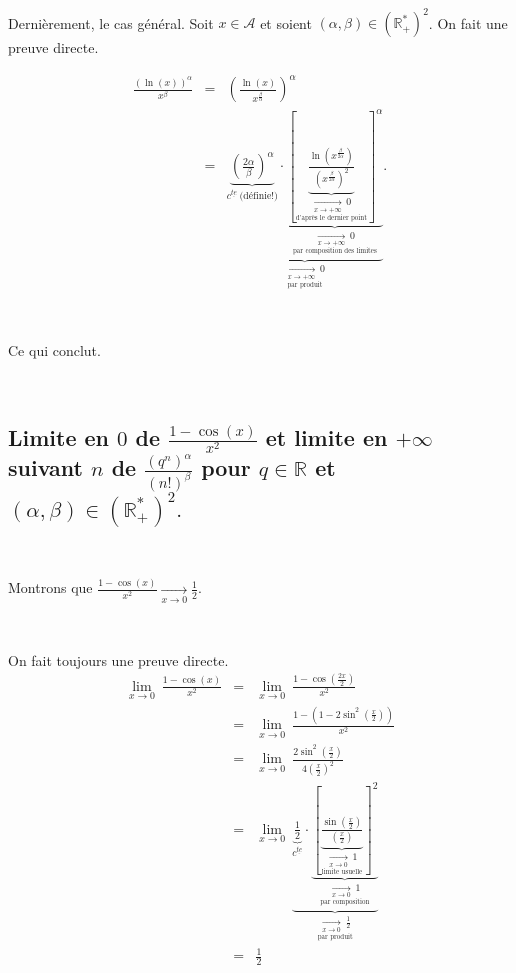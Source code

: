 \documentclass{article}
\begin{document}
\

Dernièrement, le cas général. Soit $x\in \mathcal{A}$ et soient $(\alpha,\beta)\in \left( \mathbb{R}_+^* \right)^2$. On fait une preuve directe. 

\begin{eqnarray*}
    \frac{(\ln (x))^\alpha}{x^\beta} & = & \left( \frac{\ln (x)}{x^{\frac{\beta}{\alpha}}} \right)^\alpha \\[1.5ex]
    & = & \underset{\underset{\text{par produit}}{\xrightarrow[x\to+\infty]{} \ 0}}{\underbrace{\underset{c^{\underline{te}} \ \text{(définie!)}}{\underbrace{\left( \frac{2\alpha}{\beta} \right)^\alpha}} \cdot \underset{\underset{\text{par composition des limites}}{\xrightarrow[x\to+\infty]{} \ 0}}{\underbrace{\left[ \underset{\underset{\text{d'après le dernier point}}{\xrightarrow[x\to+\infty]{} \ 0}}{\underbrace{ \frac{\ln \left( x^{\frac{\beta}{2 \alpha}} \right) }{\left( x^{\frac{\beta}{2\alpha}} \right)^2} }}\right]^\alpha}}}}.
\end{eqnarray*}

\

Ce qui conclut.

\


\subsection{Limite en $0$ de $\frac{1-\cos (x)}{x^2}$ et limite en $+\infty$ suivant $n$ de $\frac{\left(q^n \right)^\alpha}{(n!)^\beta}$ pour $q\in \mathbb{R}$ et $(\alpha,\beta)\in \left( \mathbb{R}_+^* \right)^2.$} 

\

Montrons que $\frac{1-\cos (x)}{x^2} \xrightarrow[x\to 0]{} \frac{1}{2}$.

\

On fait toujours une preuve directe. 
\begin{eqnarray*}
    \lim_{x\to0} \ \frac{1-\cos (x)}{x^2} & = & \lim_{x\to0} \ \frac{1-\cos \left( \frac{2x}{2}\right) }{x^2} \\[1ex]
    & = & \lim_{x\to0} \ \frac{1-\left( 1-2\sin ^2 \left( \frac{x}{2}\right) \right) }{x^2} \\[1ex]
    & = &  \lim_{x\to0} \ \frac{2\sin ^2 \left( \frac{x}{2}\right) }{4 \left( \frac{x}{2}\right) ^2} \\[1ex]
    & = & \lim_{x\to0} \ \underset{\underset{\text{par produit}}{\xrightarrow[x\to 0]{} \ \frac{1}{2}}}{\underbrace{\underset{c^{\underline{te}}}{\underbrace{\frac{1}{2}}} \cdot \underset{\underset{\text{par composition}}{\xrightarrow[x\to 0]{} \ 1}}{\underbrace{\left[\underset{\underset{\text{limite usuelle}}{\xrightarrow[x\to 0]{} \ 1}}{\underbrace{\frac{\sin \left( \frac{x}{2}\right) }{\left( \frac{x}{2}\right)} }} \right] ^2}}}} \\[1ex]
    & = & \frac{1}{2}
\end{eqnarray*}
\end{document}
